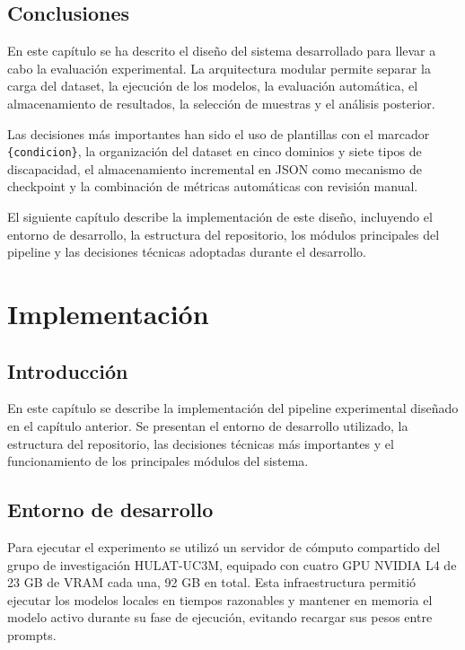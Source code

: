 \documentclass[12pt]{report} %
\renewcommand{\_}{\oldunderscore\allowbreak}
\begin{document}
\section{Conclusiones}

En este capítulo se ha descrito el diseño del sistema desarrollado para llevar a cabo la evaluación experimental. La arquitectura modular permite separar la carga del dataset, la ejecución de los modelos, la evaluación automática, el almacenamiento de resultados, la selección de muestras y el análisis posterior.

Las decisiones más importantes han sido el uso de plantillas con el marcador \texttt{\{condicion\}}, la organización del dataset en cinco dominios y siete tipos de discapacidad, el almacenamiento incremental en JSON como mecanismo de checkpoint y la combinación de métricas automáticas con revisión manual.

El siguiente capítulo describe la implementación de este diseño, incluyendo el entorno de desarrollo, la estructura del repositorio, los módulos principales del pipeline y las decisiones técnicas adoptadas durante el desarrollo.
\chapter{Implementación}

\section{Introducción}

En este capítulo se describe la implementación del pipeline experimental diseñado en el capítulo anterior. Se presentan el entorno de desarrollo utilizado, la estructura del repositorio, las decisiones técnicas más importantes y el funcionamiento de los principales módulos del sistema.

\section{Entorno de desarrollo}

Para ejecutar el experimento se utilizó un servidor de cómputo compartido del grupo de investigación HULAT-UC3M, equipado con cuatro GPU NVIDIA L4 de 23 GB de VRAM cada una, 92 GB en total. Esta infraestructura permitió ejecutar los modelos locales en tiempos razonables y mantener en memoria el modelo activo durante su fase de ejecución, evitando recargar sus pesos entre prompts.
\end{document}
